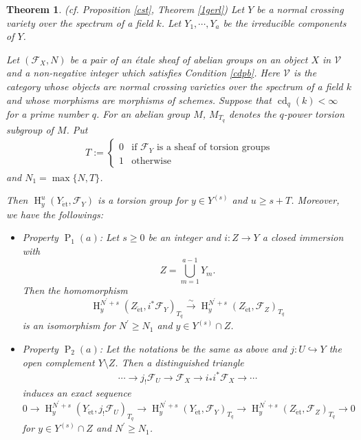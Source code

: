 \documentclass{article}
\newtheorem{thm}{\indent \sc Theorem}[section]
\newcommand{\et}{\mathrm{\acute{e}t}}
\newcommand{\HO}{\operatorname{H}}
\begin{document}
%
%
\begin{thm}\upshape\label{Ex&Ger}(cf. Proposition \ref{cst}, Theorem \ref{1gerl})
Let $Y$ be a normal crossing variety over 
the spectrum of a field $k$.
Let 
%
\begin{math}
Y_{1}, \cdots, Y_{a}
\end{math}
%
be the irreducible components of $Y$.

Let $(\mathcal{F}_{X}, N)$ be a pair of an \'{e}tale sheaf of abelian groups
on an object $X$ in $\mathcal{V}$ and a non-negative integer
which satisfies 
Condition \ref{cdpb}. 
Here $\mathcal{V}$ is the category whose
objects are normal crossing varieties over the spectrum of
a field $k$
and
whose morphisms are morphisms of schemes.
Suppose that
$\operatorname{cd}_{q}(k)<\infty$ for a prime number $q$.
For an abelian group $M$,
$M_{T_{q}}$ denotes the $q$-power torsion subgroup of $M$.
Put 
%
\begin{align*}
T:=
\left\{
%
\begin{array}{ll}
0  &  \textrm{if $\mathcal{F}_{Y}$ is a sheaf of torsion groups}  \\ [5pt]
1   &  \textrm{otherwise}
\end{array}
%
\right.
\end{align*}
%
and $N_{1}=\operatorname{max}\{N, T\}$.


Then $\HO_{y}^{u}(Y_{\et}, \mathcal{F}_{Y})$ is a torsion group for $y\in Y^{(s)}$
and $u\geq s+T$.
Moreover, we have the followings:

%
\begin{itemize}
%
\item Property $\operatorname{P}_{1}(a)$:
Let $s\geq 0$ be an integer and
$i: Z\to Y$ a closed immersion with
%
\begin{equation*}
Z
=
\displaystyle\bigcup^{a-1}_{m=1} Y_{m}.
\end{equation*}
%
Then the homomorphism
%
\begin{equation*}
\HO^{N^{\prime}+s}_{y}(
Z_{\et},
i^{*}\mathcal{F}_{Y}
)_{T_{q}}    
\xrightarrow{\sim}
\HO^{N^{\prime}+s}_{y}(
Z_{\et},
\mathcal{F}_{Z}
)_{T_{q}}
\end{equation*}
%
is an isomorphism for
$N^{\prime}\geq N_{1}$ and
$y\in Y^{(s)}\cap Z$.
%
\item Property $\operatorname{P}_{2}(a)$:
Let the notations be the same as above
and $j: U\hookrightarrow Y$ the open complement
$Y\setminus Z$.
Then 
a distinguished triangle
%
\begin{align}\label{0Indisji}
\cdots\to  
j_{!}\mathcal{F}_{U}
\to
\mathcal{F}_{X}
\to
i_{*}i^{*}\mathcal{F}_{X}
\to\cdots
\end{align}
%
induces an exact sequence
%
\begin{equation}\label{0Inindij}
0\to
\HO^{N^{\prime}+s}_{y}(
Y_{\et}, j_{!}\mathcal{F}_{U}
)_{T_{q}}
\to
\HO^{N^{\prime}+s}_{y}(
Y_{\et}, 
\mathcal{F}_{Y}
)_{T_{q}}
\to 
\HO^{N^{\prime}+s}_{y}(Z_{\et},
\mathcal{F}_{Z})_{T_{q}}
\to 0
\end{equation}
%
for $y\in Y^{(s)}\cap Z$ and $N^{\prime}\geq N_{1}$. 


\end{itemize}
\end{thm}
\end{document}
